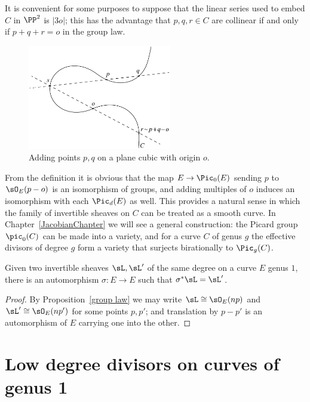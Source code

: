 It is convenient for some purposes to suppose that the linear series used to embed $C$ in $\PP^2$ is $|3o|$; this
has the advantage that $p,q,r\in C$ are collinear if and only if $p+q+r =o$ in the group law.

\begin{figure}
\centerline {\includegraphics[height=1.8in]{"main/Fig03-2"}}
\vskip-6pt
 \caption{Adding points $p, q$ on a plane cubic with origin $o$.}
\label{group law on cubic}
\end{figure}

\begin{remark}
From the definition it is obvious that 
the map
$E \to \Pic_0(E)$ sending $p$ to $\sO_E(p-o)$ is an isomorphism of groups, and adding multiples of $o$
induces an isomorphism with each $\Pic_d(E)$ as well. This provides a natural sense
in which the family of invertible sheaves on $C$ can be treated as a smooth curve.
 In Chapter~\ref{JacobianChapter} we will see a general construction:
 the 
Picard group 
%
$\pic_0(C)$ can be made into
a variety, and for a curve $C$ of genus $g$ the effective divisors
of degree $g$ form a variety that surjects birationally to $\Pic_g(C)$. 
\end{remark}
 

\begin{corollary}\label{equivalence of sheaves}
Given two invertible sheaves $\sL, \sL'$ of the same degree on a curve
%
$E$ genus $1$, there is an automorphism $\sigma: E\to E$
such that $\sigma^*\sL = \sL'$.
\end{corollary}

\begin{proof}
By Proposition~\ref{group law} we may write $\sL \cong \sO_E(np)$ and $\sL'\cong \sO_E(np')$ for some points $p,p'$; and translation by $p-p'$
is an automorphism of $E$ carrying one into the other.
\end{proof}


\section{Low degree divisors on curves of genus 1} 

